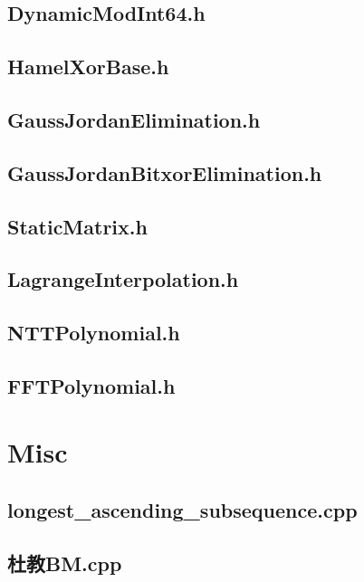 \subsection{DynamicModInt64.h}

\subsection{HamelXorBase.h}

\subsection{GaussJordanElimination.h}

\subsection{GaussJordanBitxorElimination.h}

\subsection{StaticMatrix.h}

\subsection{LagrangeInterpolation.h}

\subsection{NTTPolynomial.h}

\subsection{FFTPolynomial.h}

\section{Misc}
\subsection{longest\_ascending\_subsequence.cpp}

\subsection{杜教BM.cpp}

